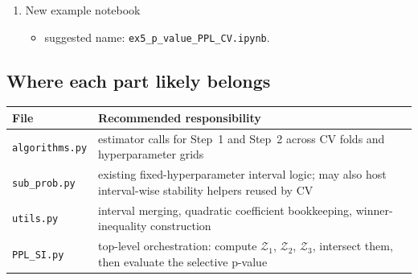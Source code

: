 \documentclass[11pt]{article}
\begin{document}
\begin{enumerate}[leftmargin=2em]
    \item New example notebook
    \begin{itemize}[leftmargin=2em]
        \item suggested name: \texttt{ex5\_p\_value\_PPL\_CV.ipynb}.
    \end{itemize}
\end{enumerate}

\subsection{Where each part likely belongs}
\begin{center}
\begin{tabular}{p{} p{}}
\toprule
\textbf{File} & \textbf{Recommended responsibility} \\
\midrule
\texttt{algorithms.py} & estimator calls for Step~1 and Step~2 across CV folds and hyperparameter grids \\
\texttt{sub\_prob.py} & existing fixed-hyperparameter interval logic; may also host interval-wise stability helpers reused by CV \\
\texttt{utils.py} & interval merging, quadratic coefficient bookkeeping, winner-inequality construction \\
\texttt{PPL\_SI.py} & top-level orchestration: compute $\mathcal{Z}_1$, $\mathcal{Z}_2$, $\mathcal{Z}_3$, intersect them, then evaluate the selective p-value \\
\bottomrule
\end{tabular}
\end{center}
\end{document}
